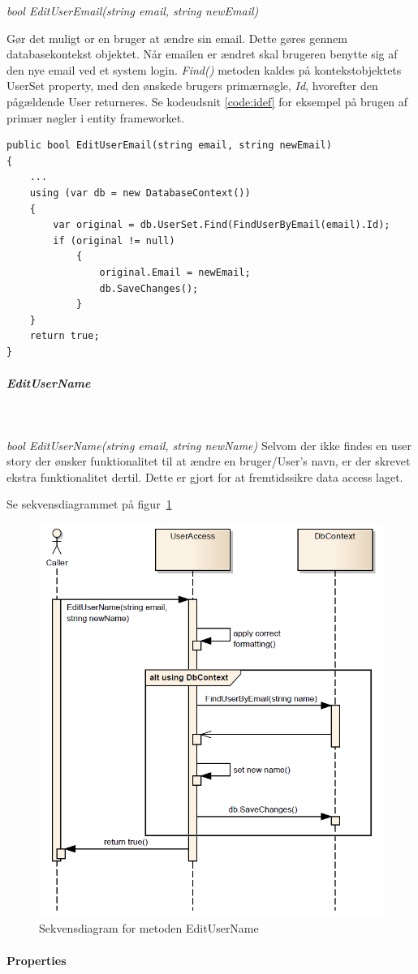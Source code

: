 \textit{bool EditUserEmail(string email, string newEmail)}

Gør det muligt or en bruger at ændre sin email. Dette gøres gennem databasekontekst objektet. Når emailen er ændret skal brugeren benytte sig af den nye email ved et system login. \textit{Find()} metoden kaldes på kontekstobjektets UserSet property, med den ønskede brugers primærnøgle, \textit{Id}, hvorefter den pågældende User returneres. Se kodeudsnit \ref{code:idef} for eksempel på brugen af primær nøgler i entity frameworket.

\begin{lstlisting}[caption=EditUserEmail - brug af primær nøgler i Entity Framework,label=code:idef]
public bool EditUserEmail(string email, string newEmail)
{
	...
	using (var db = new DatabaseContext())
	{
		var original = db.UserSet.Find(FindUserByEmail(email).Id);
		if (original != null)
			{
				original.Email = newEmail;
				db.SaveChanges();
			}
	}
	return true;
}

\end{lstlisting}

\subparagraph{EditUserName}\

\textit{bool EditUserName(string email, string newName)}
Selvom der ikke findes en user story der ønsker funktionalitet til at ændre en bruger/User's navn, er der skrevet ekstra funktionalitet dertil. Dette er gjort for at fremtidssikre data access laget.

Se sekvensdiagrammet på figur~\ref{fig:editUserName}

\begin{figure}[h]
\centering
\includegraphics[width=0.7\linewidth]{figs/dbSeq/editUserName.PNG}
\caption{Sekvensdiagram for metoden EditUserName}
\label{fig:editUserName}
\end{figure}


\paragraph{Properties}\